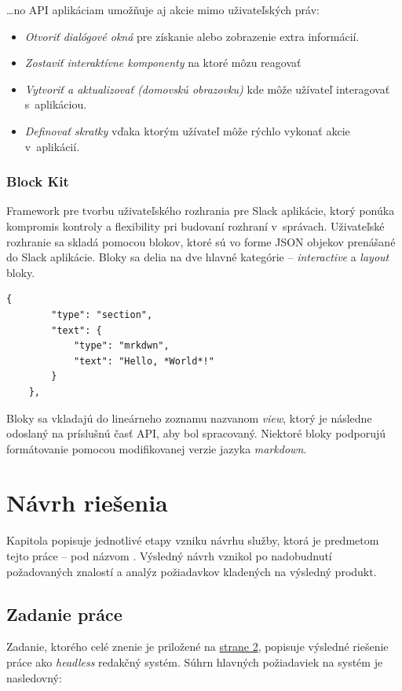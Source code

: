 \ldots no API aplikáciam umožňuje aj akcie mimo uživateľských práv:

\begin{itemize}
	\item \emph{Otvoriť dialógové okná} pre získanie alebo zobrazenie extra informácií. \cite{SlackAPI}
	\item \emph{Zostaviť interaktívne komponenty} na ktoré môzu reagovať \cite{SlackAPI}
	\item \emph{Vytvoriť a aktualizovať  (domovskú obrazovku)} kde môže užívateľ interagovať s~aplikáciou. \cite{SlackAPI}
	\item \emph{Definovať skratky} vďaka ktorým užívateľ môže rýchlo vykonať akcie v~aplikácií. \cite{SlackAPI}
\end{itemize}

\subsection{Block Kit}
Framework pre tvorbu uživateľského rozhrania pre Slack aplikácie, ktorý ponúka kompromis kontroly a flexibility pri budovaní rozhraní v~správach. \cite{SlackAPI}  Uživateľské rozhranie sa skladá pomocou blokov, ktoré sú vo forme JSON objekov prenášané do Slack aplikácie. Bloky sa delia na dve hlavné kategórie -- \emph{interactive} a \emph{layout} bloky. \\

\begin{lstlisting}[caption=Príklad jednoduchého bloku v~Slack aplikácií.]
	{
		"type": "section",
		"text": {
			"type": "mrkdwn",
			"text": "Hello, *World*!"
		}
	},
\end{lstlisting}

\bigskip

\noindent Bloky sa vkladajú do lineárneho zoznamu nazvanom \emph{view}, ktorý je následne odoslaný na príslušnú časť API, aby bol spracovaný. Niektoré bloky podporujú formátovanie pomocou modifikovanej verzie jazyka \emph{markdown}.

\chapter{Návrh riešenia}
Kapitola popisuje jednotlivé etapy vzniku návrhu služby, ktorá je predmetom tejto práce -- pod názvom . Výsledný návrh vznikol po nadobudnutí požadovaných znalostí a analýz požiadavkov kladených na výsledný produkt.

\section{Zadanie práce}
Zadanie, ktorého celé znenie je priložené na \hyperlink{page.2}{strane 2}, popisuje výsledné riešenie práce ako \emph{headless} redakčný systém. Súhrn hlavných požiadaviek na systém je nasledovný:

